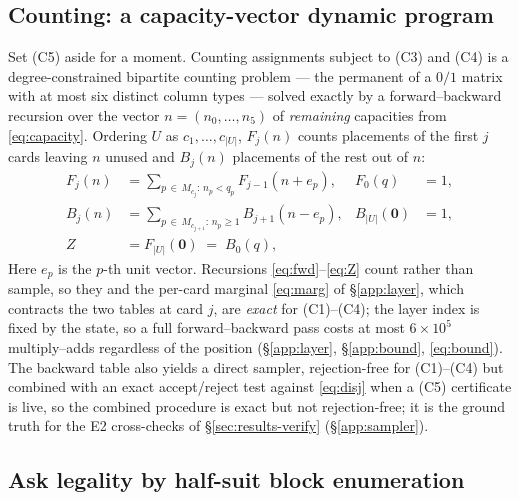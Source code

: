 \documentclass[11pt]{article}
\theoremstyle{definition}
\begin{document}
\subsection{Counting: a capacity-vector dynamic program}
\label{sec:counting}

Set (C5) aside for a moment. Counting assignments subject to (C3) and (C4) is a
degree-constrained bipartite counting problem --- the permanent of a $0/1$ matrix
with at most six distinct column types --- solved exactly by a forward--backward
recursion over the vector $n = (n_0,\dots,n_5)$ of \emph{remaining} capacities
from \eqref{eq:capacity}. Ordering $U$ as $c_1,\dots,c_{|U|}$, $F_j(n)$ counts
placements of the first $j$ cards leaving $n$ unused and $B_j(n)$ placements of
the rest out of $n$:
\begin{align}
  F_j(n) &= \sum_{p \,\in\, M_{c_j} :\, n_p < q_p} F_{j-1}(n + e_p),
  &F_0(q) &= 1, \label{eq:fwd}\\
  B_j(n) &= \sum_{p \,\in\, M_{c_{j+1}} :\, n_p \ge 1} B_{j+1}(n - e_p),
  &B_{|U|}(\mathbf{0}) &= 1, \label{eq:bwd}\\
  Z &= F_{|U|}(\mathbf{0}) \;=\; B_0(q), \label{eq:Z}
\end{align}
Here $e_p$ is the $p$-th unit vector. Recursions \eqref{eq:fwd}--\eqref{eq:Z}
count rather than sample, so they and the per-card marginal \eqref{eq:marg} of
\S\ref{app:layer}, which contracts the two tables at card $j$, are
\emph{exact} for (C1)--(C4); the layer index is fixed by the state, so a full
forward--backward pass costs at most $6 \times 10^{5}$ multiply--adds
regardless of the position (\S\ref{app:layer}, \S\ref{app:bound},
\eqref{eq:bound}). The backward table also yields a direct sampler,
rejection-free for (C1)--(C4) but combined with an exact accept/reject test
against \eqref{eq:disj} when a (C5) certificate is live, so the combined
procedure is exact but not rejection-free; it is the ground truth for the E2
cross-checks of \S\ref{sec:results-verify} (\S\ref{app:sampler}).

\subsection{Ask legality by half-suit block enumeration}
\label{sec:blocks}
\end{document}
